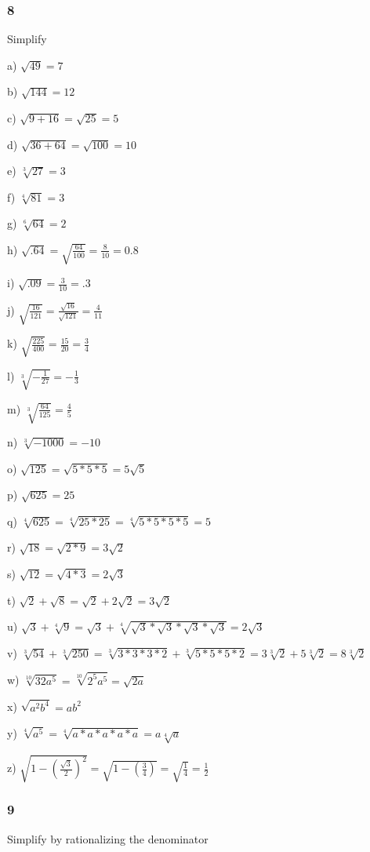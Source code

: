 \documentclass[]{report}
\begin{document}
\subsubsection{8}
Simplify


a) $\sqrt{49} = 7$


b) $\sqrt{144} = 12$

c) $\sqrt{9  + 16} = \sqrt{25} = 5$

d) $\sqrt{36+ 64} = \sqrt{100} = 10$

e) $\sqrt[3]{27} = 3$

f) $\sqrt[4]{81} = 3$

g) $\sqrt[6]{64} = 2$

h) $\sqrt{.64} = \sqrt{\frac{64}{100}} = \frac{8}{10} = 0.8$

i) $\sqrt{.09} = \frac{3}{10} = .3$

j) $\sqrt{\frac{16}{121}} = \frac{\sqrt{16}}{\sqrt{121}} = \frac{4}{11}$

k) $\sqrt{\frac{225}{400}} = \frac{15}{20} = \frac{3}{4}$

l) $\sqrt[3]{-\frac{1}{27}} = -\frac{1}{3}$

m) $\sqrt[3]{\frac{64}{125}} = \frac{4}{5}$

n) $\sqrt[3]{-1000} = -10$ 

o) $\sqrt{125} = \sqrt{5 * 5 * 5} = 5\sqrt{5}$

p) $\sqrt{625} = 25$

q) $\sqrt[4]{625} = \sqrt[4]{25 * 25} = \sqrt[4]{5 * 5 * 5 * 5} = 5$

r) $\sqrt{18} = \sqrt{2 * 9} = 3\sqrt{2}$

s) $\sqrt{12} = \sqrt{4 * 3} = 2\sqrt{3}$

t) $\sqrt{2} + \sqrt{8} = \sqrt{2} + 2\sqrt{2} = 3\sqrt{2}$

u) $\sqrt{3} + \sqrt[4]{9} =  \sqrt{3} + \sqrt[4]{\sqrt{3} * \sqrt{3} * \sqrt{3} * \sqrt{3}} = 2\sqrt{3} $

v) $\sqrt[3]{54} + \sqrt[3]{250} = \sqrt[3]{3 * 3 * 3 * 2 } + \sqrt[3]{5 * 5 * 5 *2} = 3\sqrt[3]{2} + 5\sqrt[3]{2}  = 8\sqrt[3]2$

w) $\sqrt[10]{32a^5} = \sqrt[10]{2^5a^5} = \sqrt{2a}$

x) $\sqrt{a^2b^4} = ab^2$

y) $\sqrt[4]{a^5} = \sqrt[4]{a * a * a * a * a} = a \sqrt[4]{a}$

z) $\sqrt{1 - (\frac{\sqrt{3}}{2})^2} = \sqrt{1 - (\frac{3}{4})} = \sqrt{\frac{1}{4}}  = \frac{1}{2}$

\subsubsection{9}
Simplify by rationalizing the denominator
\end{document}
